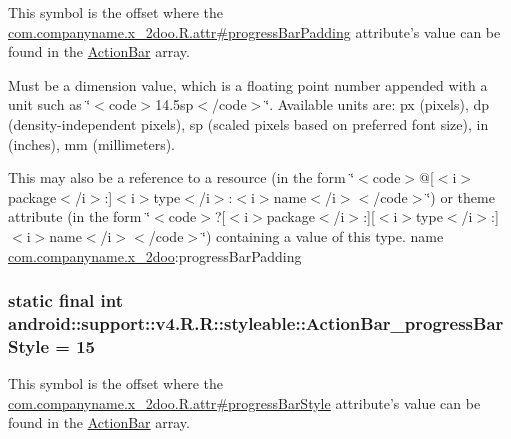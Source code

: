 This symbol is the offset where the \hyperlink{classcom_1_1companyname_1_1x__2doo_1_1_r_1_1attr_95037778c73e5ec76da2313587e3f44f}{com.companyname.x\_\-2doo.R.attr\#progressBarPadding} attribute's value can be found in the \hyperlink{classandroid_1_1support_1_1v4_1_1_r_1_1styleable_5c6cf2c83551ebae05f365bb913fdddf}{ActionBar} array.

Must be a dimension value, which is a floating point number appended with a unit such as \char`\"{}$<$code$>$14.5sp$<$/code$>$\char`\"{}. Available units are: px (pixels), dp (density-independent pixels), sp (scaled pixels based on preferred font size), in (inches), mm (millimeters). 

This may also be a reference to a resource (in the form \char`\"{}$<$code$>$@\mbox{[}$<$i$>$package$<$/i$>$:\mbox{]}$<$i$>$type$<$/i$>$:$<$i$>$name$<$/i$>$$<$/code$>$\char`\"{}) or theme attribute (in the form \char`\"{}$<$code$>$?\mbox{[}$<$i$>$package$<$/i$>$:\mbox{]}\mbox{[}$<$i$>$type$<$/i$>$:\mbox{]}$<$i$>$name$<$/i$>$$<$/code$>$\char`\"{}) containing a value of this type.  name \hyperlink{namespacecom_1_1companyname_1_1x__2doo}{com.companyname.x\_\-2doo}:progressBarPadding \hypertarget{classandroid_1_1support_1_1v4_1_1_r_1_1styleable_4d02536c4a498848e9b2a9223f011d73}{
\subsubsection[{ActionBar\_\-progressBarStyle}]{\setlength{\rightskip}{0pt plus 5cm}static final int android::support::v4.R.R::styleable::ActionBar\_\-progressBarStyle = 15}}
\label{classandroid_1_1support_1_1v4_1_1_r_1_1styleable_4d02536c4a498848e9b2a9223f011d73}


This symbol is the offset where the \hyperlink{classcom_1_1companyname_1_1x__2doo_1_1_r_1_1attr_a1e12e08bf522ee404b749a5ab9a8b78}{com.companyname.x\_\-2doo.R.attr\#progressBarStyle} attribute's value can be found in the \hyperlink{classandroid_1_1support_1_1v4_1_1_r_1_1styleable_5c6cf2c83551ebae05f365bb913fdddf}{ActionBar} array.

